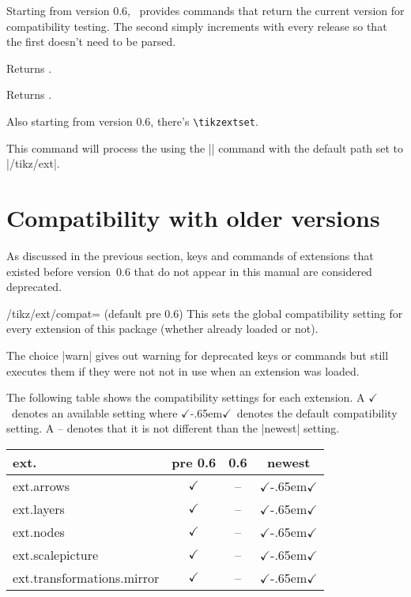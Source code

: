 \begin{multicols}{2}
Starting from version 0.6,
\tikzextname\ provides commands that return the current version for compatibility testing.
The second simply increments with every release
so that the first doesn't need to be parsed.
\begin{command}{\tikzextversion}
  Returns \texttt{\tikzextversion}.
\end{command}
\begin{command}{\tikzextversionnumber}
  Returns \texttt{\tikzextversionnumber}.
\end{command}
%
Also starting from version 0.6, there's \texttt{\textbackslash tikzextset}.
\begin{command}{\tikzextset{}}
  This command will process the  using the
  |\pgfkeys| command with the default path set to |/tikz/ext|.
\end{command}

\newcolumn
\section{Compatibility with older versions}
As discussed in the previous section,
keys and commands of extensions that existed before version~0.6
that do not appear in this manual are considered deprecated.

\begin{key}{/tikz/ext/compat= (default pre 0.6)}
  This sets the global compatibility setting for every extension of this package
  (whether already loaded or not).

  The choice |warn| gives out warning for deprecated keys or commands
  but still executes them if they were not not in use when an extension was loaded.
  
  The following table shows the compatibility settings for each extension.
  \newcommand*\X{$\checkmark$}%
  \newcommand*\Xdef{\X\kern-.65em\X}%
  A \X\ denotes an available setting where \Xdef\ denotes the default compatibility setting.
  A -- denotes that it is not different than the |newest| setting.
  \newcommand*\tabHeader[1]{\rotatebox{90}{#1}}
  \begin{center}
  \begin{tabular}{>{\ttfamily ext.}l ccc}
    \toprule
    \multicolumn{1}{l}{Extension} & pre 0.6 & 0.6 & newest \\ \midrule
    arrows                        & \X      & --  & \Xdef  \\
    layers                        & \X      & --  & \Xdef  \\
    nodes                         & \X      & --  & \Xdef  \\
    scalepicture                  & \X      & --  & \Xdef  \\
    transformations.mirror        & \X      & --  & \Xdef  \\ \bottomrule
  \end{tabular}
  \end{center}
\end{key}


\end{multicols}
